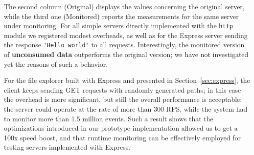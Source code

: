 The second column (Original) displays the values concerning the original server, while the third one
(Monitored) reports the measurements for the same server under monitoring.
For all simple servers directly implemented with the \lstinline{http} module we registered modest overheads, as well
as for the Express server sending the response \lstinline{'Hello world'} to all requests.
Interestingly, the monitored version of \textbf{unconsumed data} outperforms the original version; we have
not investigated yet the reasons of such a behavior.

For the file explorer built with Express and presented in Section~\ref{sec:express}, the client keeps sending GET requests
with randomly generated paths; in this case the overhead is more significant, but still the overall performance 
is acceptable: the server could operate at the rate of more than 300 RPS, while the system had to monitor more than 1.5 million events.
Such a result shows that the optimizations introduced in our prototype implementation allowed us
to get a 100x speed boost, and that runtime monitoring can be effectively employed for testing servers implemented with Express.
